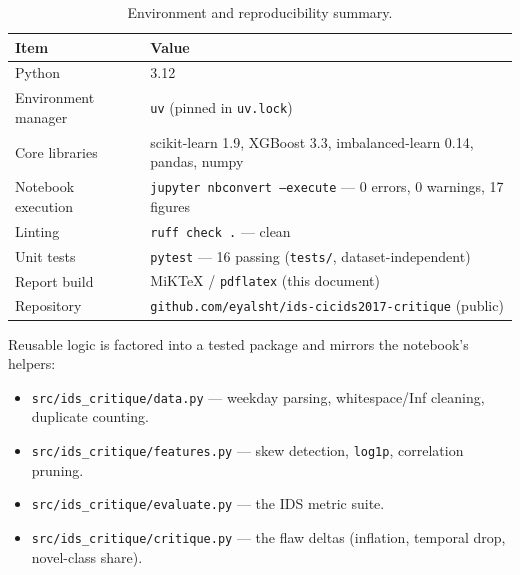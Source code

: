 \documentclass[11pt,a4paper]{article}
\begin{document}
\begin{table}[H]
\centering\small
\begin{tabular}{l l}
\toprule
\textbf{Item} & \textbf{Value}\\
\midrule
Python & 3.12\\
Environment manager & \texttt{uv} (pinned in \texttt{uv.lock})\\
Core libraries & scikit-learn 1.9, XGBoost 3.3, imbalanced-learn 0.14, pandas, numpy\\
Notebook execution & \texttt{jupyter nbconvert --execute} --- 0 errors, 0 warnings, 17 figures\\
Linting & \texttt{ruff check .} --- clean\\
Unit tests & \texttt{pytest} --- 16 passing (\texttt{tests/}, dataset-independent)\\
Report build & MiKTeX / \texttt{pdflatex} (this document)\\
Repository & \texttt{github.com/eyalsht/ids-cicids2017-critique} (public)\\
\bottomrule
\end{tabular}
\caption{Environment and reproducibility summary.}
\end{table}

\noindent Reusable logic is factored into a tested package and mirrors the notebook's helpers:
\begin{itemize}[leftmargin=1.4em,itemsep=1pt]
\item \texttt{src/ids\_critique/data.py} --- weekday parsing, whitespace/Inf cleaning, duplicate counting.
\item \texttt{src/ids\_critique/features.py} --- skew detection, \texttt{log1p}, correlation pruning.
\item \texttt{src/ids\_critique/evaluate.py} --- the IDS metric suite.
\item \texttt{src/ids\_critique/critique.py} --- the flaw deltas (inflation, temporal drop, novel-class share).
\end{itemize}
\end{document}
